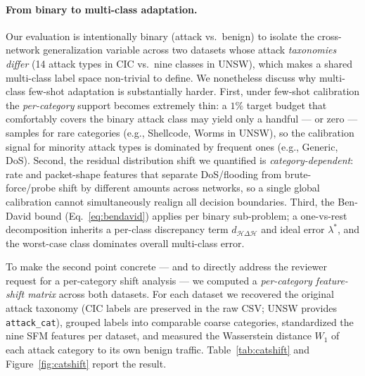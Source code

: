 \documentclass[preprint,12pt,authoryear]{elsarticle}
\begin{document}
\paragraph{From binary to multi-class adaptation.} Our evaluation is intentionally
binary (attack vs.\ benign) to isolate the cross-network generalization variable
across two datasets whose attack \emph{taxonomies differ} (14 attack types in CIC
vs.\ nine classes in UNSW), which makes a shared multi-class label space non-trivial
to define. We nonetheless discuss why multi-class few-shot adaptation is
substantially harder. First, under few-shot calibration the \emph{per-category}
support becomes extremely thin: a $1\%$ target budget that comfortably covers the
binary attack class may yield only a handful --- or zero --- samples for rare
categories (e.g., Shellcode, Worms in UNSW), so the calibration signal for minority
attack types is dominated by frequent ones (e.g., Generic, DoS). Second, the
residual distribution shift we quantified is \emph{category-dependent}: rate and
packet-shape features that separate DoS/flooding from brute-force/probe shift by
different amounts across networks, so a single global calibration cannot
simultaneously realign all decision boundaries. Third, the Ben-David bound
(Eq.~\eqref{eq:bendavid}) applies per binary sub-problem; a one-vs-rest
decomposition inherits a per-class discrepancy term $d_{\mathcal{H}\Delta\mathcal{H}}$
and ideal error $\lambda^\ast$, and the worst-case class dominates overall
multi-class error.

To make the second point concrete --- and to directly address the reviewer
request for a per-category shift analysis --- we computed a
\emph{per-category feature-shift matrix} across both datasets. For each dataset we
recovered the original attack taxonomy (CIC labels are preserved in the raw CSV;
UNSW provides \texttt{attack\_cat}), grouped labels into comparable coarse
categories, standardized the nine SFM features per dataset, and measured the
Wasserstein distance $W_1$ of each attack category to its own benign traffic.
Table~\ref{tab:catshift} and Figure~\ref{fig:catshift} report the result.
\end{document}
